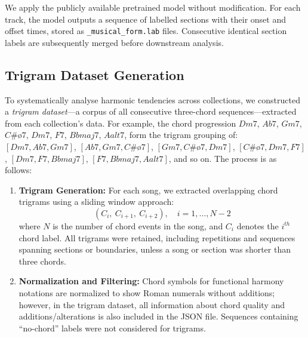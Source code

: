 \documentclass{article}
\begin{document}
We apply the publicly available pretrained model without modification. For each track, the model outputs a sequence of labelled sections with their onset and offset times, stored as \texttt{\_musical\_form.lab} files. Consecutive identical section labels are subsequently merged before downstream analysis.


\subsection{Trigram Dataset Generation}
\label{sec:trigram_generation}
To systematically analyse harmonic tendencies across collections, we constructed a \textit{trigram dataset}—a corpus of all consecutive three-chord sequences—extracted from each collection's data.
For example, the chord progression $Dm7$, $Ab7$, $Gm7$, $C\#ø7$, $Dm7$, $F7$, $Bbmaj7$, $Aalt7$, form the trigram grouping of: $[Dm7, Ab7, Gm7]$, $[Ab7, Gm7, C\#ø7]$, $[Gm7, C\#ø7, Dm7]$, $[C\#ø7, Dm7, F7]$, $[Dm7, F7, Bbmaj7]$, $[F7, Bbmaj7, Aalt7]$, and so on. 
The process is as follows:

\begin{enumerate}
    \item \textbf{Trigram Generation:}
    For each song, we extracted overlapping chord trigrams using a sliding window approach:
    \[
        (C_{i},\ C_{i+1},\ C_{i+2}), \quad i = 1, \ldots, N-2
    \]
    where $N$ is the number of chord events in the song, and $C_i$ denotes the $i^{th}$ chord label. All trigrams were retained, including repetitions and sequences spanning sections or boundaries, unless a song or section was shorter than three chords.
    
    \item \textbf{Normalization and Filtering:}
    Chord symbols for functional harmony notations are normalized to show Roman numerals without additions; however, in the trigram dataset, all information about chord quality and additions/alterations is also included in the JSON file. Sequences containing ``no-chord'' labels were not considered for trigrams.
    
\end{enumerate}
\end{document}
